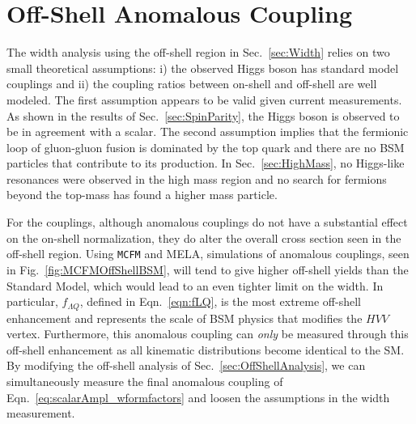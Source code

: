 \section{Off-Shell Anomalous Coupling}
\label{sec:OffShellAnom}

The width analysis using the off-shell region in Sec.~\ref{sec:Width} relies on two small theoretical assumptions: i) the observed Higgs boson has standard model couplings and ii) the coupling ratios between on-shell and off-shell are well modeled. The first assumption appears to be valid given current measurements. As shown in the results of Sec.~\ref{sec:SpinParity}, the Higgs boson is observed to be in agreement with a scalar. The second assumption implies that the fermionic loop of gluon-gluon fusion is dominated by the top quark and there are no BSM particles that contribute to its production. In Sec.~\ref{sec:HighMass}, no Higgs-like resonances were observed in the high mass region and no search \cite{Agashe:2014kda} for fermions beyond the top-mass has found a higher mass particle.

For the couplings, although anomalous couplings do not have a substantial effect on the on-shell normalization, they do alter the overall cross section seen in the off-shell region. Using {\tt MCFM} and MELA, simulations of anomalous couplings, seen in Fig.~\ref{fig:MCFMOffShellBSM}, will tend to give higher off-shell yields than the Standard Model, which would lead to an even tighter limit on the width. In particular, $f_{\Lambda Q}$, defined in Eqn.~\ref{eqn:fLQ}, is the most extreme off-shell enhancement and represents the scale of BSM physics that modifies the $HVV$ vertex. Furthermore, this anomalous coupling can \textit{only} be measured through this off-shell enhancement as all kinematic distributions become identical to the SM. By modifying the off-shell analysis of Sec.~\ref{sec:OffShellAnalysis}, we can simultaneously measure the final anomalous coupling of Eqn.~\ref{eq:scalarAmpl_wformfactors} and loosen the assumptions in the width measurement.

